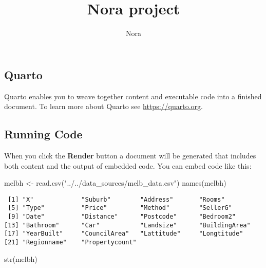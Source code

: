 \documentclass[
  letterpaper,
  DIV=11,
  numbers=noendperiod]{scrartcl}
\title{Nora project}
\author{Nora}
\date{}
\newenvironment{Shaded}{\begin{snugshade}}{\end{snugshade}}
\newcommand{\FunctionTok}[1]{\textcolor[rgb]{0.28,0.35,0.67}{#1}}
\newcommand{\NormalTok}[1]{\textcolor[rgb]{0.00,0.23,0.31}{#1}}
\newcommand{\OtherTok}[1]{\textcolor[rgb]{0.00,0.23,0.31}{#1}}
\newcommand{\StringTok}[1]{\textcolor[rgb]{0.13,0.47,0.30}{#1}}
\begin{document}
\maketitle


\subsection{Quarto}\label{quarto}

Quarto enables you to weave together content and executable code into a
finished document. To learn more about Quarto see
\url{https://quarto.org}.

\subsection{Running Code}\label{running-code}

When you click the \textbf{Render} button a document will be generated
that includes both content and the output of embedded code. You can
embed code like this:

\begin{Shaded}
\begin{Highlighting}[]
\NormalTok{melbh }\OtherTok{\textless{}{-}} \FunctionTok{read.csv}\NormalTok{(}\StringTok{"../../data\_sources/melb\_data.csv"}\NormalTok{)}
\FunctionTok{names}\NormalTok{(melbh)}
\end{Highlighting}
\end{Shaded}

\begin{verbatim}
 [1] "X"             "Suburb"        "Address"       "Rooms"        
 [5] "Type"          "Price"         "Method"        "SellerG"      
 [9] "Date"          "Distance"      "Postcode"      "Bedroom2"     
[13] "Bathroom"      "Car"           "Landsize"      "BuildingArea" 
[17] "YearBuilt"     "CouncilArea"   "Lattitude"     "Longtitude"   
[21] "Regionname"    "Propertycount"
\end{verbatim}

\begin{Shaded}
\begin{Highlighting}[]
\FunctionTok{str}\NormalTok{(melbh)}
\end{Highlighting}
\end{Shaded}
\end{document}
